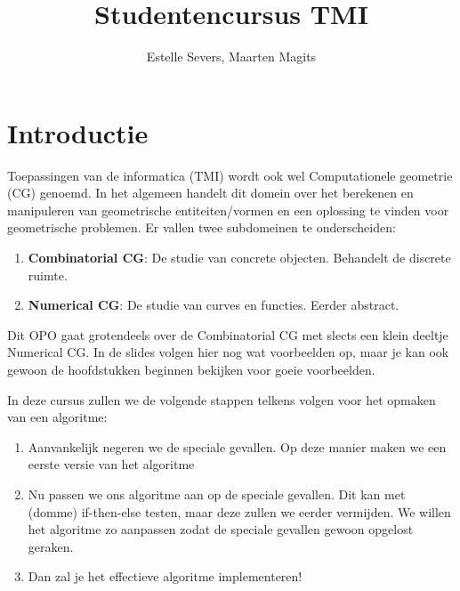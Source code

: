 \documentclass[12pt,a4paper]{article}
\author{Estelle Severs, Maarten Magits}
\title{Studentencursus TMI}
\begin{document}
	\maketitle
	\tableofcontents
	\section*{Introductie}
	Toepassingen van de informatica (TMI) wordt ook wel Computationele geometrie (CG) genoemd.
	In het algemeen handelt dit domein over het berekenen en manipuleren van geometrische entiteiten/vormen en een oplossing te vinden voor geometrische problemen.
	Er vallen twee subdomeinen te onderscheiden:
	\begin{enumerate}
		\item \textbf{Combinatorial CG}: De studie van concrete objecten. Behandelt de discrete ruimte.
		\item \textbf{Numerical CG}: De studie van curves en functies. Eerder abstract.
	\end{enumerate}
	Dit OPO gaat grotendeels over de Combinatorial CG met slects een klein deeltje Numerical CG. In de slides volgen hier nog wat voorbeelden op, maar je kan ook gewoon de hoofdstukken beginnen bekijken voor goeie voorbeelden. 
	
	In deze cursus zullen we de volgende stappen telkens volgen voor het opmaken van een algoritme: 
	\begin{enumerate}
		\item Aanvankelijk negeren we de speciale gevallen. Op deze manier maken we een eerste versie van het algoritme
		\item Nu passen we ons algoritme aan op de speciale gevallen. Dit kan met (domme) if-then-else testen, maar deze zullen we eerder vermijden. We willen het algoritme zo aanpassen zodat de speciale gevallen gewoon opgelost geraken. 
		\item Dan zal je het effectieve algoritme implementeren!
	\end{enumerate}
	
	
\end{document}
